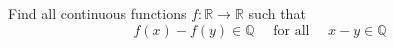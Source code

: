 Find all continuous functions $f: \mathbb{R}\to \mathbb{R}$ such that
\[ f(x)-f(y)\in \mathbb{Q}\quad \text{ for all }\quad x-y\in\mathbb{Q} \]